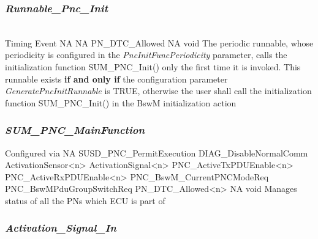 \subsubsection{\textit{Runnable_Pnc_Init}}

\\
{Timing Event}
{NA}
{NA}
{PN_DTC_Allowed}
{NA}
{void}
{The periodic runnable, whose periodicity is configured in the \textit{PncInitFuncPeriodicity} parameter, calls the initialization function SUM_PNC_Init() only the first time it is invoked. This runnable exists \textbf{if and only if} the configuration parameter \textit{GeneratePncInitRunnable} is TRUE, otherwise the user shall call the initialization function SUM_PNC_Init() in the BswM initialization action}
\\
\subsubsection{\textit{SUM_PNC_MainFunction}}

{Configured via }
{NA}
{SUSD_PNC_PermitExecution \newline DIAG_DisableNormalComm \newline ActivationSensor<n> \newline ActivationSignal<n>}
{PNC_ActiveTxPDUEnable<n> \newline PNC_ActiveRxPDUEnable<n> \newline PNC_BswM_CurrentPNCModeReq \newline PNC_BswMPduGroupSwitchReq \newline PN_DTC_Allowed<n>}
{NA}
{void}
{Manages status of all the PNs which ECU is part of}

{           
   }

\subsubsection{\textit{Activation_Signal_In}}

